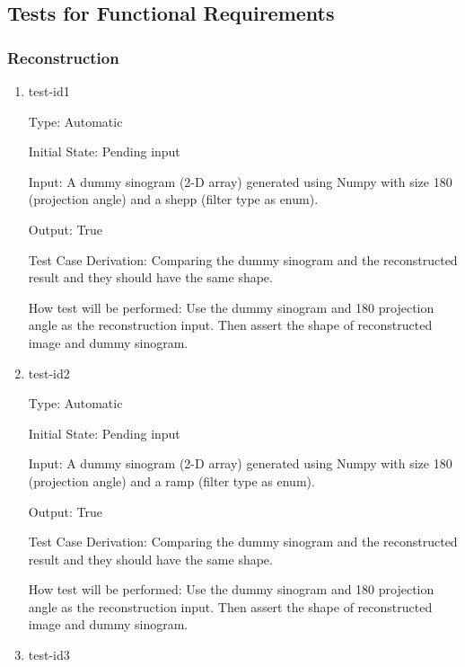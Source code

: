 \documentclass[12pt, titlepage]{article}
\begin{document}
\subsection{Tests for Functional Requirements}

\subsubsection{Reconstruction}


\begin{enumerate}

\item{test-id1\\}

Type: Automatic

Initial State: Pending input

Input: A dummy sinogram (2-D array) generated using Numpy with size 180
(projection angle) and a shepp (filter type as enum).

Output: True

Test Case Derivation: Comparing the dummy sinogram and the reconstructed result
and they should have the same shape.

How test will be performed: Use the dummy sinogram and 180 projection angle as
the reconstruction input. Then assert the shape of reconstructed image and dummy sinogram.

\item{test-id2\\}

Type: Automatic

Initial State: Pending input

Input: A dummy sinogram (2-D array) generated using Numpy with size 180
(projection angle) and a ramp (filter type as enum).

Output: True

Test Case Derivation: Comparing the dummy sinogram and the reconstructed result
and they should have the same shape.

How test will be performed: Use the dummy sinogram and 180 projection angle as
the reconstruction input. Then assert the shape of reconstructed image and dummy sinogram.

\item{test-id3\\}


\end{enumerate}
\end{document}
